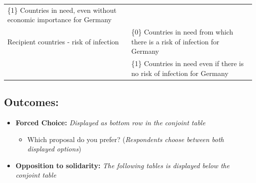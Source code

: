 \documentclass[12pt,oneside,smallheadings,chapterprefix=true]{article}
\begin{document}
\begin{longtable}[]{@{}ll@{}}
\begin{minipage}[t]{0.54\columnwidth}
\{1\} Countries in need, even without economic importance for
Germany\strut
\end{minipage}\tabularnewline
\begin{minipage}[t]{0.40\columnwidth}\raggedright
Recipient countries - risk of infection\strut
\end{minipage} & \begin{minipage}[t]{0.54\columnwidth}\raggedright
\{0\} Countries in need from which there is a risk of infection for
Germany\strut
\end{minipage}\tabularnewline
\begin{minipage}[t]{0.40\columnwidth}\raggedright
\strut
\end{minipage} & \begin{minipage}[t]{0.54\columnwidth}\raggedright
\{1\} Countries in need even if there is no risk of infection for
Germany\strut
\end{minipage}\tabularnewline
\bottomrule
\end{longtable}

\hypertarget{outcomes}{%
\subsection{Outcomes:}\label{outcomes}}

\begin{itemize}
\tightlist
\item
  \textbf{Forced Choice:} \emph{Displayed as bottom row in the conjoint
  table}

  \begin{itemize}
  \tightlist
  \item
    Which proposal do you prefer? (\emph{Respondents choose between both
    displayed options})
  \end{itemize}
\end{itemize}

\begin{itemize}
\tightlist
\item
  \textbf{Opposition to solidarity:} \emph{The following tables is
  displayed below the conjoint table}
\end{itemize}
\end{document}
